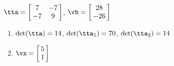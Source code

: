 {$\tta = \left[\hskip -3pt \begin{array}{cc} 7&-7\\  -7&9\end {array} \hskip -3pt
 \right] $,
 \quad
$\vb = \left[\hskip -3pt \begin{array}{c} 28\\  -26\end {array} \hskip -3pt
 \right]$}
{\begin{enumerate}
\item	$\det(\tta) = 14$, $\det(\tta_1) = 70$, $\det(\tta_2) = 14$
\item $\vx = \left[\hskip -3pt \begin{array}{c} 5\\  1\end{array}\hskip -3pt \right]$
\end{enumerate}
}
  

  

 



